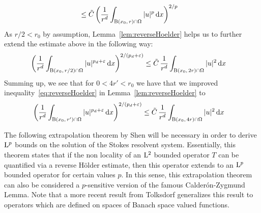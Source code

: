 \begin{rem}
\begin{align*}
      &\leq \tilde C\, \bigg( \frac{1}{r^d} \int_{\BB(x_0,\, r) \cap \Omega} |u|^p \d x \bigg)^{2/p} %
    \end{align*}
    As $r/2 < r_0$ by assumption, Lemma~\ref{lem:reverseHoelder} helps us to further extend the estimate above in the following way:
    \begin{align*}
      \bigg( \frac{1}{r^d} \int_{\BB(x_0,\, r/2) \cap \Omega} |u|^{p_d + \varepsilon}\d x \bigg)^{2/(p_d + \varepsilon)} 
      &\leq \tilde C\, \frac{1}{r^d} \int_{\BB(x_0,\, 2 r) \cap \Omega} |u|^2 \d x %
    \end{align*}
    Summing up, we see that for $0 < 4 r' < r_0$ we have that we improved inequality~\eqref{eq:reverseHoelder} in Lemma~\ref{lem:reverseHoelder} to 
    \begin{align}
      \label{eq:improvedreverseHoelder}
      \bigg( \frac{1}{r^d} \int_{\BB(x_0,\, r') \cap \Omega} |u|^{p_d + \varepsilon}\d x \bigg)^{2/(p_d + \varepsilon)} 
      &\leq \tilde C\, \frac{1}{r^d} \int_{\BB(x_0,\, 4 r) \cap \Omega} |u|^2 \d x %
    \end{align}
  \end{rem}



The following extrapolation theorem by Shen \cite[Thm.\@~3.3]{shenExtra} will be necessary in order to derive $\mathrm{L}^p$ bounds on the solution of the Stokes resolvent system.
Essentially, this theorem states that if the non locality of an $\mathrm{L}^2$ bounded operator  $T$ can be quantified via a reverse Hölder estimate, then this operator extends to an $\mathrm{L}^p$ bounded operator for certain values $p$.
In this sense, this extrapolation theorem can also be considered a $p$-sensitive version of the famous Calder\'on-Zygmund Lemma.
Note that a more recent result from Tolksdorf \cite[Thm.\@~4.1]{tolksdorf2017} generalizes this result to operators which are defined on spaces of Banach space valued functions.

